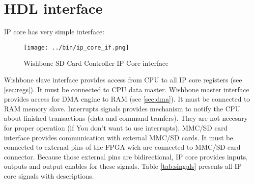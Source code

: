 \section{HDL interface}
\label{sec:hdl_if}

    IP core has very simple interface:
    \begin{figure}[H]
        \centering
        \texttt{[image: ../bin/ip\_core\_if.png]}
        \caption{Wishbone SD Card Controller IP Core interface}
        \label{img:ip_core_if}
    \end{figure}
    Wishbone slave interface provides access from CPU to all IP core registers (see \ref{sec:regs}). It must
    be connected to CPU data master. Wishbone master interface provides access for DMA engine to RAM (see \ref{sec:dma}). 
    It must be connected to RAM memory slave. Interrupts signals provides mechanism to notify the CPU about finished transactions (data and command tranfers).
    They are not necesary for proper operation (if You don't want to use interrupts). MMC/SD card interface provides communication with external MMC/SD cards.
    It must be connected to external pins of the FPGA wich are connected to MMC/SD card connector. Because those external pins are bidirectional, IP core
    provides inputs, outputs and output enables for these signals.
    Table \ref{tab:singals} presents all IP core signals with descriptions.
    
